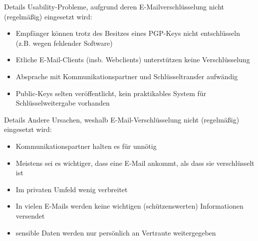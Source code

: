 \documentclass[]{beamer}
\begin{document}
\begin{frame}{Details}
	Usability-Probleme, aufgrund deren E-Mailverschlüsselung nicht (regelmäßig) eingesetzt wird:
	\begin{itemize}[<+->]
	  \item Empfänger können trotz des Besitzes eines PGP-Keys nicht entschlüsseln (z.B. wegen fehlender Software)
	  \item Etliche E-Mail-Clients (insb. Webclients) unterstützen keine Verschlüsselung
	  \item Absprache mit Kommunikationspartner und Schlüsseltransfer aufwändig
	  \item Public-Keys selten veröffentlicht, kein praktikables System für Schlüsselweitergabe vorhanden
  \end{itemize}
\end{frame}

\begin{frame}{Details}
	Andere Ursachen, weshalb E-Mail-Verschlüsselung nicht (regelmäßig) eingesetzt wird:
	\begin{itemize}[<+->]
	  \item Kommunikationspartner halten es für unnötig
	  \item Meistens sei es wichtiger, dass eine E-Mail ankommt, als dass sie verschlüsselt ist
	  \item Im privaten Umfeld wenig verbreitet
	  \item In vielen E-Mails werden keine wichtigen (schützenswerten) Informationen versendet
	  \item sensible Daten werden nur persönlich an Vertraute weitergegeben
	\end{itemize}
	
\end{frame}
\end{document}
